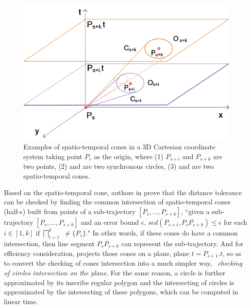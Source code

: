 




\begin{figure}[tb!]
	\centering
	\includegraphics[scale=0.66]{figures/Fig-CIS.png}
	\vspace{-1ex}
	\caption{\small Examples of spatio-temporal cones in a 3D Cartesian coordinate system taking point $P_s$ as the origin, where (1) $P_{s+i}$ and $P_{s+k}$ are two points, (2)  and  are two synchronous circles, (3)  and  are two spatio-temporal cones.}
	\vspace{-2ex}
	\label{fig:cis}
\end{figure}

Based on the spatio-temporal cone, authors in \cite{Lin:Cised} prove that the \sed distance tolerance can be checked by finding the common intersection of spatio-temporal cones  (half-$\epsilon$) built from points of a sub-trajectory $[P_s,...,P_{s+k}]$, \ie ``{given a sub-trajectory $[P_s,...,P_{s+k}]$ and an error bound $\epsilon$, $sed(P_{s+i}, \overline{P_sP_{s+k}})\le \epsilon$ for each $i \in [1,k]$ if  $\bigsqcap_{i=1}^{k}$ $\ne \{P_s\}$}."
In other words, if these cones do have a common intersection, then line segment $\overline{P_sP_{s+k}}$ can represent the sub-trajectory. And for efficiency consideration, \cised projects those cones on a plane, \eg plane $t=P_{s+1}.t$, so as to convert the checking of cones intersection into a much simpler way, \ie~\textit{checking of circles intersection on the plane}.
For the same reason, a circle is further approximated by its inscribe regular polygon and the intersecting of circles is approximated by the intersecting of these polygons, which can be computed in linear time.

